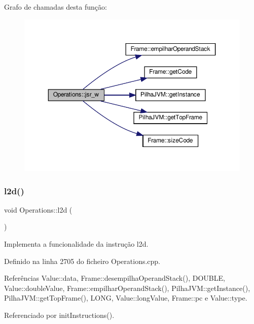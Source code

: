 Grafo de chamadas desta função\+:\nopagebreak
\begin{figure}[H]
\begin{center}
\leavevmode
\includegraphics[width=350pt]{classOperations_a22241dabd3678c4ab77bbe5882c3a4db_cgraph}
\end{center}
\end{figure}
\mbox{\label{classOperations_aab1532a2f22ab943a1ec37e33ae742b3}} 
\subsubsection{\texorpdfstring{l2d()}{l2d()}}
{\footnotesize\ttfamily void Operations\+::l2d (\begin{DoxyParamCaption}{ }\end{DoxyParamCaption})\hspace{0.3cm}{\ttfamily [private]}}



Implementa a funcionalidade da instrução l2d. 



Definido na linha 2705 do ficheiro Operations.\+cpp.



Referências Value\+::data, Frame\+::desempilha\+Operand\+Stack(), D\+O\+U\+B\+LE, Value\+::double\+Value, Frame\+::empilhar\+Operand\+Stack(), Pilha\+J\+V\+M\+::get\+Instance(), Pilha\+J\+V\+M\+::get\+Top\+Frame(), L\+O\+NG, Value\+::long\+Value, Frame\+::pc e Value\+::type.



Referenciado por init\+Instructions().


